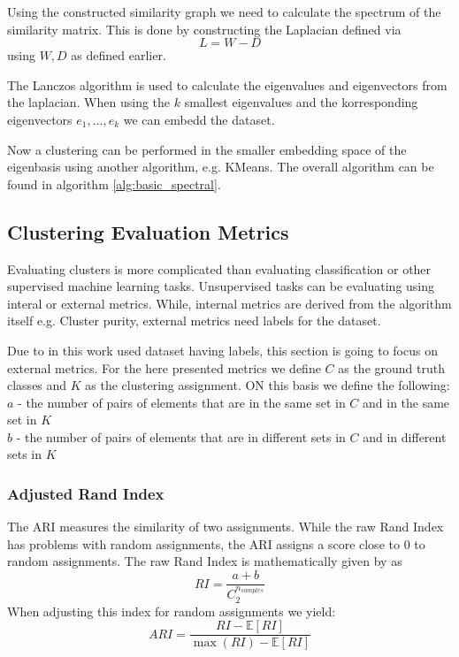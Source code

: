 Using the constructed similarity graph we need to calculate the spectrum of the similarity matrix.
This is done by constructing the Laplacian defined via
\[L = W - D\]
using \(W, D\) as defined earlier.

The Lanczos algorithm \cite{lanczos_iteration_1950} is used to calculate the eigenvalues and eigenvectors from the laplacian.
When using the \(k\) smallest eigenvalues and the korresponding eigenvectors \(e_1, \ldots, e_k\) we can embedd the dataset.

Now a clustering can be performed in the smaller embedding space of the eigenbasis using another algorithm, e.g. KMeans.
The overall algorithm can be found in algorithm \ref{alg:basic_spectral}.


\subsection{Clustering Evaluation Metrics}
\label{ssec:clustering_evaluation_metrics}

Evaluating clusters is more complicated than evaluating classification or other supervised machine learning tasks.
Unsupervised tasks can be evaluating using interal or external metrics. While, internal metrics are derived from the algorithm itself e.g. Cluster purity, external metrics need labels for the dataset.

Due to in this work used dataset having labels, this section is going to focus on external metrics.
For the here presented metrics we define \(C\) as the ground truth classes and \(K\) as the clustering assignment.
ON this basis we define the following:\\
\(a\) - the number of pairs of elements that are in the same set in \(C\) and in the same set in \(K\)\\
\(b\) - the number of pairs of elements that are in different sets in \(C\) and in different sets in \(K\)\\


\subsubsection{Adjusted Rand Index}
The \gls{ARI} measures the similarity of two assignments. While the raw Rand Index has problems with random assignments, the \gls{ARI} assigns a score close to \(0\)
to random assignments.
The raw Rand Index is mathematically given by \cite{noauthor_23_2020} as
\[RI = \frac{a + b}{C_2^{n_{samples}}}\]
When adjusting this index for random assignments we yield:
\[ARI = \frac{RI - \mathbb{E} [RI]}{\max (RI) - \mathbb{E} [RI]}\]
